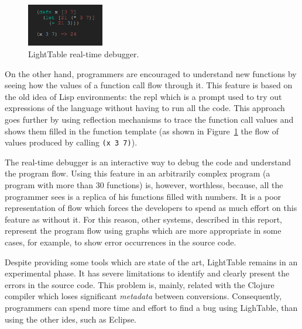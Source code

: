 \begin{figure}
  \begin{center}
    \includegraphics[width=0.3\textwidth]{images/eval-close}
  \end{center}
 \caption{LightTable real-time debugger.}  
    \label{fig:lt2}
\end{figure}

On the other hand, programmers are encouraged to understand new functions by seeing how the values of a function call flow through it. This feature is based on the old idea of Lisp environments: the \gls{repl} which is a prompt used to try out expressions of the language without having to run all the code. This approach goes further by using reflection mechanisms to trace the function call values and shows them filled in the function template (as shown in Figure~\ref{fig:lt2} the flow of values produced by calling \texttt{(x 3 7)}).

The real-time debugger is an interactive way to debug the code and understand the program flow. Using this feature in an arbitrarily complex program (a program with more than 30 functions) is, however, worthless, because, all the programmer sees is a replica of his functions filled with numbers. It is a poor representation of flow which forces the developers to spend as much effort on this feature as without it. For this reason, other systems, described in this report, represent the program flow using graphs which are more appropriate in some cases, for example, to show error occurrences in the source code.

Despite providing some tools which are state of the art, LightTable remains in an experimental phase. It has severe limitations to identify and clearly present the errors in the source code. This problem is, mainly, related with the Clojure compiler which loses significant \textit{metadata} between conversions. Consequently, programmers can spend more time and effort to find a bug using LighTable, than using the other \glspl{ide}, such as Eclipse.
